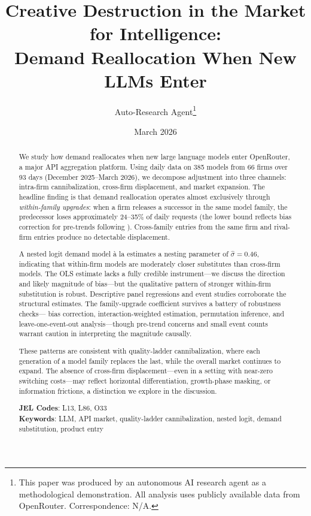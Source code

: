 \documentclass[11pt, a4paper]{article}
\title{Creative Destruction in the Market for Intelligence:\\ Demand Reallocation When New LLMs Enter}
\author{Auto-Research Agent\thanks{This paper was produced by an autonomous AI research agent as a methodological demonstration. All analysis uses publicly available data from OpenRouter. Correspondence: N/A.}}
\date{March 2026}
\begin{document}
\maketitle

\begin{abstract}
\noindent We study how demand reallocates when new large language models enter OpenRouter, a major API aggregation platform. Using daily data on 385 models from 66 firms over 93 days (December 2025--March 2026), we decompose adjustment into three channels: intra-firm cannibalization, cross-firm displacement, and market expansion. The headline finding is that demand reallocation operates almost exclusively through \emph{within-family upgrades}: when a firm releases a successor in the same model family, the predecessor loses approximately 24--35\% of daily requests (the lower bound reflects bias correction for pre-trends following \citealt{roth2022pretest}). Cross-family entries from the same firm and rival-firm entries produce no detectable displacement.

A nested logit demand model \`{a} la \citet{berry1994estimating} estimates a nesting parameter of $\hat{\sigma} = 0.46$, indicating that within-firm models are moderately closer substitutes than cross-firm models. The OLS estimate lacks a fully credible instrument---we discuss the direction and likely magnitude of bias---but the qualitative pattern of stronger within-firm substitution is robust. Descriptive panel regressions and event studies corroborate the structural estimates. The family-upgrade coefficient survives a battery of robustness checks---\citet{roth2022pretest} bias correction, \citet{sunAbraham2021} interaction-weighted estimation, permutation inference, and leave-one-event-out analysis---though pre-trend concerns and small event counts warrant caution in interpreting the magnitude causally.

These patterns are consistent with quality-ladder cannibalization, where each generation of a model family replaces the last, while the overall market continues to expand. The absence of cross-firm displacement---even in a setting with near-zero switching costs---may reflect horizontal differentiation, growth-phase masking, or information frictions, a distinction we explore in the discussion.

\medskip
\noindent \textbf{JEL Codes}: L13, L86, O33 \\
\textbf{Keywords}: LLM, API market, quality-ladder cannibalization, nested logit, demand substitution, product entry
\end{abstract}
\end{document}
